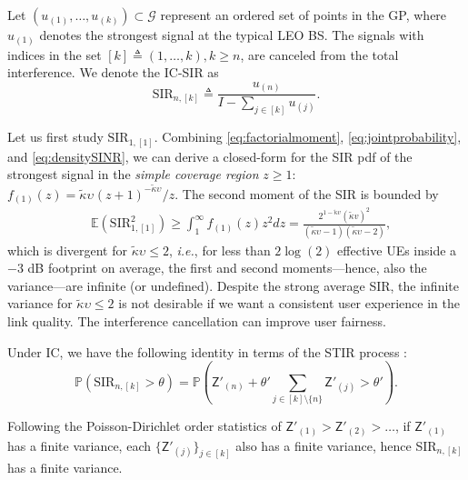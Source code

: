 \documentclass[lettersize,journal]{IEEEtran}
\begin{document}
Let $(u_{(1)}, \dots, u_{(k)}) \subset \mathcal{G}$ represent an ordered set of points in the GP, where $u_{(1)}$ denotes the strongest signal at the typical LEO BS. The signals with indices in the set $[k] \triangleq (1,\dots,k), k\geq n$,  are canceled from the total interference. We denote the IC-SIR as
\begin{equation}
  \label{eq:IC-SINR}
  \text{SIR}_{n,[k]} \triangleq \frac{u_{(n)}}{I-\sum_{j \in [k]} u_{(j)}}.
\end{equation}


Let us first study $\text{SIR}_{1,[1]}$. Combining \eqref{eq:factorialmoment}, \eqref{eq:jointprobability}, and \eqref{eq:densitySINR}, we can derive a closed-form for the SIR pdf of the strongest signal in the \textit{simple coverage region} $z\geq 1$: $f_{(1)}(z) =  {\tilde{\kappa}\upsilon_{}\left({z + 1} \right)^{-\tilde{\kappa}\upsilon_{}}}/{z}$. The second moment of the SIR is bounded by
\begin{align}
  \label{eq:SIR2}
&\mathbb{E}(\text{SIR}^2_{1,[1]}) \geq \int_{1}^{\infty}f_{(1)}(z) z^2 dz = \frac{2^{1-\tilde{\kappa}v}(\tilde{\kappa}v)^2}{(\tilde{\kappa}\upsilon-1)(\tilde{\kappa}\upsilon-2)},
\end{align}
which is divergent for $\tilde{\kappa}\upsilon \leq 2$, \textit{i.e.}, for less than $2\log(2)$ effective UEs inside a $-3$ dB footprint on average, the first and second moments---hence, also the variance---are infinite (or undefined). Despite the strong average SIR, the infinite variance for $\tilde{\kappa}\upsilon \leq 2$ is not desirable if we want a consistent user experience in the link quality. The interference cancellation can improve user fairness.


Under IC, we have the following identity in terms of the STIR process \cite[Eq. 69]{7305791}:
\begin{equation}
   \mathbb{P}(\text{SIR}_{n,[k]} > \theta) = \mathbb{P}\left(\mathsf{Z}'_{(n)}+\theta'\sum_{j\in [k] \setminus \{n\}}\mathsf{Z}'_{(j)} > \theta'\right).
\end{equation}


Following the Poisson-Dirichlet order statistics of $\mathsf{Z}'_{(1)} > \mathsf{Z}'_{(2)} >\dots $, if $\mathsf{Z}'_{(1)}$ has a finite variance, each $\{\mathsf{Z}'_{(j)}\}_{j \in [k]}$ also has a finite variance, hence SIR$_{n,[k]}$ has a finite variance.
\end{document}
